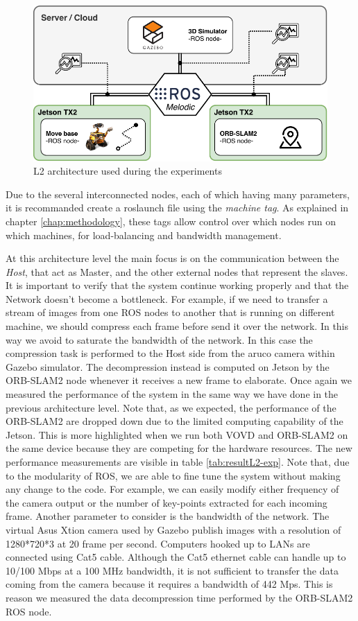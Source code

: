 \begin{figure}[htbp]
	\centering
	\includegraphics[width=\textwidth]{images/L2-arch-exp}
	\caption{L2 architecture used during the experiments}
	\label{fig:l2arch-exp}
\end{figure}

Due to the several interconnected nodes, each of which having many parameters, it is recommanded create a roslaunch file  using the \textit{machine tag}. As explained in chapter \ref{chap:methodology}, these tags allow control over which nodes run on which machines, for load-balancing and bandwidth management.

At this architecture level the main focus is on the communication between the \textit{Host}, that act as Master, and the other external nodes that represent the slaves. It is important to verify that the system continue working properly and that the Network doesn't become a bottleneck. For example, if we need to transfer a stream of images from one ROS nodes to another that is running on different machine, we should compress each frame before send it over the network. In this way we avoid to saturate the bandwidth of the network. In this case the compression task is performed to the Host side from the aruco camera within Gazebo simulator. The decompression instead is computed on Jetson by the ORB-SLAM2 node whenever it receives a new frame to elaborate.
Once again we measured the performance of the system in the same way we have done in the previous architecture level.
Note that, as we expected, the performance of the ORB-SLAM2 are dropped down due to the limited computing capability of the Jetson. This is more highlighted when we run both VOVD and ORB-SLAM2 on the same device because they are competing for the hardware resources.
The new performance measurements are visible in table \ref{tab:resultL2-exp}.
Note that, due to the modularity of ROS, we are able to fine tune the system without making any change to the code. For example, we can easily modify either frequency of the camera output or the number of key-points extracted for each incoming frame.
Another parameter to consider is the bandwidth of the network. The virtual Asus Xtion camera used by Gazebo publish images with a resolution of 1280*720*3 at 20 frame per second.
Computers hooked up to LANs are connected using Cat5 cable. Although the Cat5 ethernet cable can handle up to 10/100 Mbps at a 100 MHz bandwidth, it is not sufficient to transfer the data coming from the camera because it requires a bandwidth of 442 Mps.
This is reason we measured the data decompression time performed by the ORB-SLAM2 ROS node.

